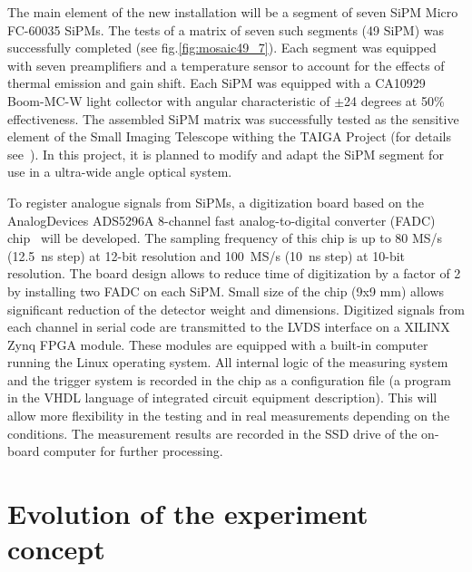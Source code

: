 \documentclass[a4paper,11pt]{article}
\begin{document}
The main element of the new installation will be a segment of seven SiPM Micro FC-60035 SiPMs. The tests of a matrix of seven such segments (49 SiPM) was successfully completed (see fig.\ref{fig:mosaic49_7}). Each segment was equipped with seven preamplifiers and a temperature sensor to account for the effects of thermal emission and gain shift. Each SiPM was equipped with a CA10929 Boom-MC-W light collector with angular characteristic of $\pm$24 degrees at 50\% effectiveness. The assembled SiPM matrix was successfully tested as the sensitive element of the Small Imaging Telescope withing the TAIGA Project (for details see~\cite{SIT20}). In this project, it is planned to modify and adapt the SiPM segment for use in a ultra-wide angle optical system.

To register analogue signals from SiPMs, a digitization board based on the AnalogDevices ADS5296A 8-channel fast analog-to-digital converter (FADC) chip~\cite{FADC} will be developed. The sampling frequency of this chip is up to 80 MS/s (12.5~ns step) at 12-bit resolution and 100~MS/s (10~ns step) at 10-bit resolution.
The board design allows to reduce time of digitization by a factor of 2 by installing two FADC on each SiPM.
Small size of the chip (9x9 mm) allows significant reduction of the detector weight and dimensions. 
Digitized signals from each channel in serial code are transmitted to the LVDS interface on a XILINX Zynq FPGA module.
These modules are equipped with a built-in computer running the Linux operating system.
All internal logic of the measuring system and the trigger system is recorded in the chip as a configuration file (a program in the VHDL language of integrated circuit equipment description). This will allow more flexibility in the testing and in real measurements depending on the conditions.
The measurement results are recorded in the SSD drive of the on-board computer for further processing.


\section{Evolution of the experiment concept}
\end{document}
